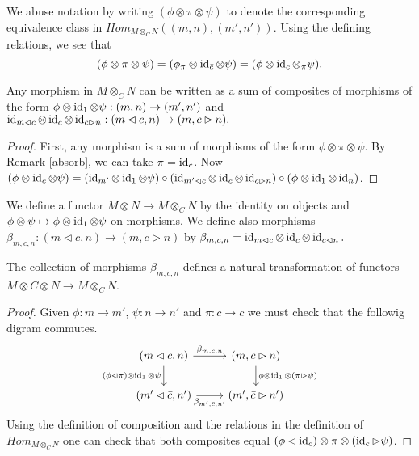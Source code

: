 \begin{remark}\label{absorb}

We abuse notation by writing $(\phi\otimes\pi\otimes\psi)$ to denote the corresponding equivalence class in $Hom_{M\otimes_C N}((m,n),(m',n'))$. Using the defining relations, we see that $$(\phi\otimes\pi\otimes\psi)=(\phi_{\pi}\otimes\operatorname{id}_{\bar{c}}\otimes\psi)=(\phi\otimes\operatorname{id}_c\otimes{_{\pi}\psi}).$$ \end{remark}

\begin{lemma}\label{decompose}

Any morphism in $M\otimes_C N$ can be written as a sum of composites of morphisms of the form $\phi\otimes\operatorname{id}_{1}\otimes\psi:(m,n)\to(m',n')$ and $\operatorname{id}_{m\lhd c}\otimes\operatorname{id}_c\otimes\operatorname{id}_{c\rhd n}:(m\lhd c,n)\to(m,c\rhd n).$ \end{lemma}

\begin{proof}

First, any morphism is a sum of morphisms of the form $\phi\otimes\pi\otimes\psi$. By Remark \ref{absorb}, we can take $\pi=\operatorname{id}_c$. Now $(\phi\otimes\operatorname{id}_c\otimes\psi)=(\operatorname{id}_{m'}\otimes\operatorname{id}_1\otimes\psi)\circ (\operatorname{id}_{m'\lhd c}\otimes\operatorname{id}_c\otimes\operatorname{id}_{c\rhd n})\circ (\phi\otimes\operatorname{id}_1\otimes\operatorname{id}_n)$.\end{proof}


\begin{definition}
We define a functor $M\otimes N\to M\otimes_C N$ by the identity on objects and $\phi\otimes\psi\mapsto\phi\otimes\operatorname{id}_1\otimes\psi$ on morphisms. We define also morphisms $\beta_{m,c,n}:(m\lhd c,n)\to (m, c \rhd n)$ by $\beta_{m,c,n}=\operatorname{id}_{m\lhd c}\otimes\operatorname{id}_c\otimes\operatorname{id}_{c\lhd n}.$ \end{definition}

\begin{lemma}

The collection of morphisms $\beta_{m,c,n}$ defines a natural transformation of functors $M\otimes C \otimes N\to M\otimes_C N$.\end{lemma}

\begin{proof}Given $\phi:m\to m'$, $\psi: n\to n'$ and $\pi:c\to \bar{c}$ we must check that the followig digram commutes.\[\begin{tikzcd}
	{(m\lhd c, n)} & {(m,c\rhd n)} \\
	{(m'\lhd \bar{c}, n')} & {(m',\bar{c}\rhd n')}
	\arrow["{\beta_{m,c,n}}", from=1-1, to=1-2]
	\arrow["{(\phi\lhd\pi)\otimes\id_1\otimes\psi}"', from=1-1, to=2-1]
	\arrow["{\phi\otimes\id_1\otimes(\pi\rhd\psi)}", from=1-2, to=2-2]
	\arrow["{\beta_{m',\bar{c},n'}}"', from=2-1, to=2-2]
\end{tikzcd}\] Using the definition of composition and the relations in the definition of $Hom_{M\otimes_C N}$ one can check that both composites equal $(\phi\lhd\operatorname{id}_c)\otimes\pi\otimes(\operatorname{id}_{\bar{c}}\rhd\psi)$.\end{proof}

